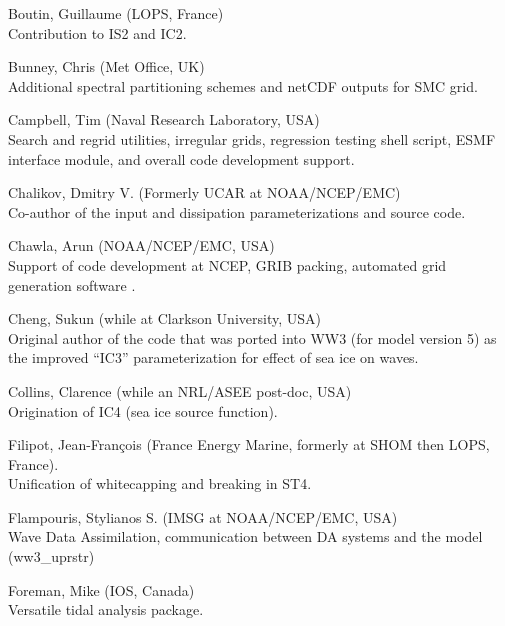 \begin{list}{\ldots}{ }
\item [Boutin, Guillaume] (LOPS, France) \\
  Contribution to IS2 and IC2. 

\item [Bunney, Chris] (Met Office, UK) \\
Additional spectral partitioning schemes and netCDF outputs for SMC grid.

\item [Campbell, Tim] (Naval Research Laboratory, USA)\\ 
  Search and regrid utilities, irregular grids, regression testing shell script, ESMF interface module, 
  and overall code development support.

\item [Chalikov, Dmitry V.] (Formerly UCAR at NOAA/NCEP/EMC) \\ Co-author of the
  \cite{tol:JPO96} input and dissipation parameterizations and source code.

\item [Chawla, Arun](NOAA/NCEP/EMC, USA) \\
  Support of code development at NCEP, GRIB packing, automated grid generation
  software \citep{tol:MMAB07a, tol:OMOD08a}.

\item [Cheng, Sukun] (while at Clarkson University, USA) \\
  Original author of the code that was ported into WW3 (for model version 5) as the improved ``IC3'' parameterization for effect of sea ice on waves.

\item [Collins, Clarence] (while an NRL/ASEE post-doc, USA) \\
  Origination of IC4 (sea ice source function).

\item [Filipot, Jean-Fran{\c c}ois] (France Energy Marine, formerly at SHOM then LOPS, France).\\
  Unification of whitecapping and breaking in ST4. 

\item [Flampouris, Stylianos S.] (IMSG at NOAA/NCEP/EMC, USA) \\
      Wave Data Assimilation, communication between DA systems and the model (ww3\_uprstr) 

\item [Foreman, Mike]  (IOS, Canada) \\
  Versatile tidal analysis package. 
  

\end{list}
